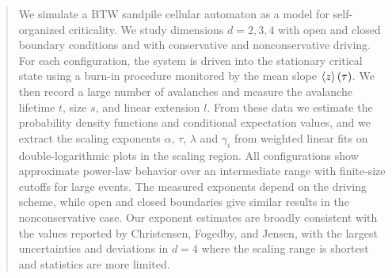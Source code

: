 \begin{abstract}
    We simulate a BTW sandpile cellular automaton as a model for self-organized criticality. We study dimensions $d=2,3,4$ with open and closed boundary conditions and with conservative and nonconservative driving. For each configuration, the system is driven into the stationary critical state using a burn-in procedure monitored by the mean slope $\expval{z}(\tau)$. We then record a large number of avalanches and measure the avalanche lifetime $t$, size $s$, and linear extension $l$. From these data we estimate the probability density functions and conditional expectation values, and we extract the scaling exponents $\alpha$, $\tau$, $\lambda$ and $\gamma_i$ from weighted linear fits on double-logarithmic plots in the scaling region. All configurations show approximate power-law behavior over an intermediate range with finite-size cutoffs for large events. The measured exponents depend on the driving scheme, while open and closed boundaries give similar results in the nonconservative case. Our exponent estimates are broadly consistent with the values reported by Christensen, Fogedby, and Jensen, with the largest uncertainties and deviations in $d=4$ where the scaling range is shortest and statistics are more limited.
\end{abstract}
